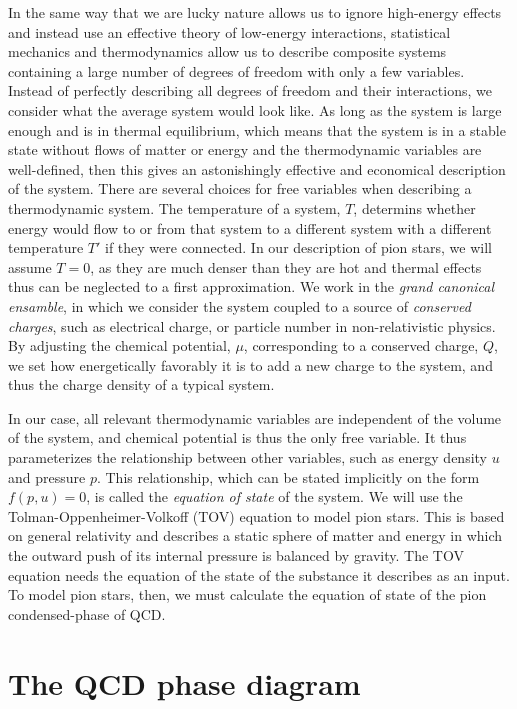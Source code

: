 In the same way that we are lucky nature allows us to ignore high-energy effects and instead use an effective theory of low-energy interactions, statistical mechanics and thermodynamics allow us to describe composite systems containing a large number of degrees of freedom with only a few variables.
Instead of perfectly describing all degrees of freedom and their interactions, we consider what the average system would look like.
As long as the system is large enough and is in thermal equilibrium, which means that the system is in a stable state without flows of matter or energy and the thermodynamic variables are well-defined, then this gives an astonishingly effective and economical description of the system.
There are several choices for free variables when describing a thermodynamic system.
The temperature of a system, $T$, determins whether energy would flow to or from that system to a different system with a different temperature $T'$ if they were connected.
In our description of pion stars, we will assume $T = 0$, as they are much denser than they are hot and thermal effects thus can be neglected to a first approximation.
We work in the \emph{grand canonical ensamble}, in which we consider the system coupled to a source of \emph{conserved charges}, such as electrical charge, or particle number in non-relativistic physics.
By adjusting the chemical potential, $\mu$, corresponding to a conserved charge, $Q$, we set how energetically favorably it is to add a new charge to the system, and thus the charge density of a typical system.

In our case, all relevant thermodynamic variables are independent of the volume of the system, and chemical potential is thus the only free variable.
It thus parameterizes the relationship between other variables, such as energy density $u$ and pressure $p$.
This relationship, which can be stated implicitly on the form $f(p, u) = 0$, is called the \emph{equation of state} of the system.
We will use the Tolman-Oppenheimer-Volkoff (TOV) equation to model pion stars.
This is based on general relativity and describes a static sphere of matter and energy in which the outward push of its internal pressure is balanced by gravity.
The TOV equation needs the equation of the state of the substance it describes as an input.
To model pion stars, then, we must calculate the equation of state of the pion condensed-phase of QCD.



\section{The QCD phase diagram}

